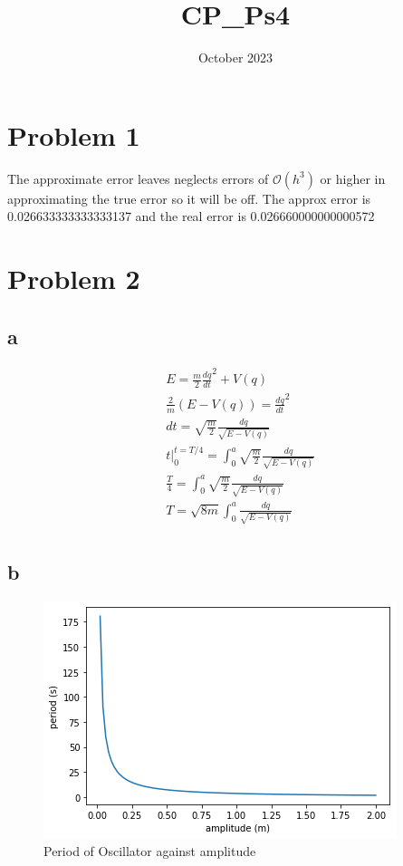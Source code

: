 \documentclass{article}
\title{CP_Ps4}
\date{October 2023}
\begin{document}
\section{Problem 1}
The approximate error leaves neglects errors of $\mathcal{O}\left(h^3\right)$ or higher in approximating the true error so it will be off. The approx error is  0.026633333333333137 and the real error is 0.026660000000000572
\section{Problem 2}
\subsection{a}\begin{align*}
    &E=\frac{m}{2}\frac{dq}{dt}^2+V(q)\\
    &\frac{2}{m}\left(E-V(q)\right)=\frac{dq}{dt}^2\\
    &dt=\sqrt{\frac{m}{2}}\frac{dq}{\sqrt{E-V(q)}}\\
    &t |^{t=T/4}_{0}=\int_0^a\sqrt{\frac{m}{2}}\frac{dq}{\sqrt{E-V(q)}}\\
    &\frac{T}{4}=\int_0^a\sqrt{\frac{m}{2}}\frac{dq}{\sqrt{E-V(q)}}\\
    &T=\sqrt{8m}\int_0^a\frac{dq}{\sqrt{E-V(q)}}\\
\end{align*}
\subsection{b} 
\begin{figure}[H]
    \centering
    \includegraphics[width=\textwidth]{plot 5.10b.png}
    \caption{Period of Oscillator against amplitude}
    \label{fig:enter-label}
\end{figure}
\end{document}
